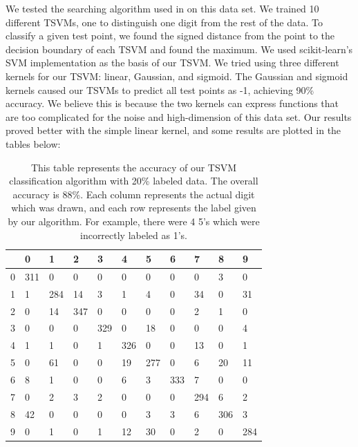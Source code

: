 \documentclass[11pt]{article}
\begin{document}
We tested the searching algorithm used in \cite{Joachims:1999} on this data set. We trained 10 different TSVMs, one to distinguish one digit from the rest of the data. To classify a given test point, we found the signed distance from the point to the decision boundary of each TSVM and found the maximum. We used scikit-learn's SVM implementation as the basis of our TSVM. We tried using three different kernels for our TSVM: linear, Gaussian, and sigmoid. The Gaussian and sigmoid kernels caused our TSVMs to predict all test points as -1, achieving 90\% accuracy. We believe this is because the two kernels can express functions that are too complicated for the noise and high-dimension of this data set. Our results proved better with the simple linear kernel, and some results are plotted in the tables below:\par

\begin{table}[]
  \centering
  \caption{This table represents the accuracy of our TSVM classification algorithm with 20\% labeled data. The overall accuracy is 88\%. Each column represents the actual digit which was drawn, and each row represents the label given by our algorithm. For example, there were 4 5's which were incorrectly labeled as 1's.}
  \label{my-table}
  \vspace{.3in}
  \begin{tabular}{l|llllllllll}
    & 0 & 1 & 2 & 3 & 4 & 5 & 6 & 7 & 8 & 9\\\hline
    0 &311 & 0   & 0   & 0   & 0   & 0   & 0   & 0   & 3   & 0   \\
    1 &1   & 284 & 14  & 3   & 1   & 4   & 0   & 34  & 0   & 31  \\
    2 & 0   & 14  & 347 & 0   & 0   & 0   & 0   & 2   & 1   & 0   \\
    3 & 0   & 0   & 0   & 329 & 0   & 18  & 0   & 0   & 0   & 4   \\
    4 & 1   & 1   & 0   & 1   & 326 & 0   & 0   & 13  & 0   & 1   \\
    5 & 0   & 61  & 0   & 0   & 19  & 277 & 0   & 6   & 20  & 11  \\
    6 & 8   & 1   & 0   & 0   & 6   & 3   & 333 & 7   & 0   & 0   \\
    7 & 0   & 2   & 3   & 2   & 0   & 0   & 0   & 294 & 6   & 2   \\
    8 & 42  & 0   & 0   & 0   & 0   & 3   & 3   & 6   & 306 & 3   \\
    9 & 0   & 1   & 0   & 1   & 12  & 30  & 0   & 2   & 0   & 284
  \end{tabular}
  \end{table}
\end{document}
